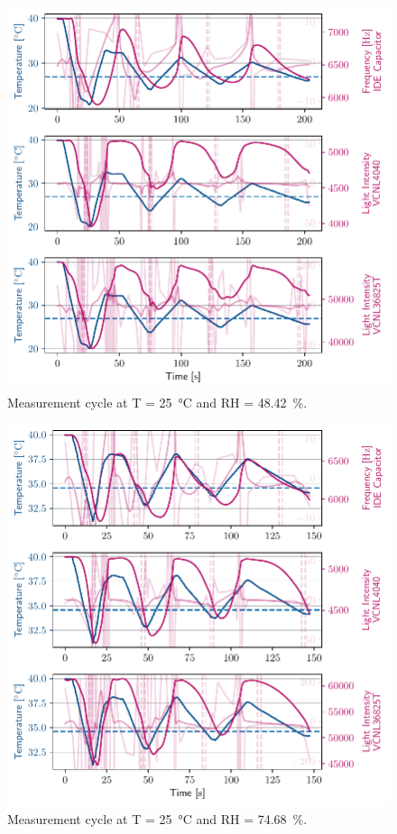 \begin{figure}[ht]
    \centering
    \includegraphics{graphs/t40rh48.4.pdf}
    \caption{Measurement cycle at T = \qty{25}{\celsius} and RH = \qty{48.42}{\percent}.}
    
\end{figure}

\begin{figure}[ht]
    \centering
    \includegraphics{graphs/t40rh75.pdf}
    \caption{Measurement cycle at T = \qty{25}{\celsius} and RH = \qty{74.68}{\percent}.}
\end{figure}

